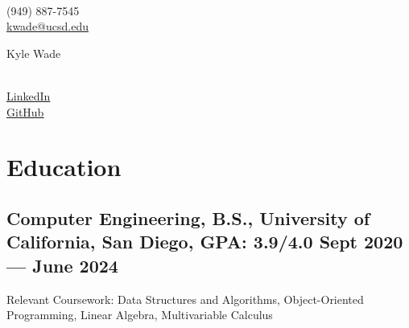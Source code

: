 \documentclass[a4,10pt]{article}
\newcommand{\subtext}[1]{
#1\par\vspace{-0.2cm}}
\begin{document}
\begin{center}
    \begin{minipage}[b]{0.24\textwidth}
            \large \\
            \large (949) 887-7545 \\
            \large \href{mailto:kwade@ucsd.edu}{kwade@ucsd.edu} 
    \end{minipage}%
    \begin{minipage}[b]{0.5\textwidth}
            \centering
            {\HUGE Kyle Wade} \\ %
            \vspace{0.1cm}
            {\color{UI_blue} \Large{}} \\
    \end{minipage}%
    \begin{minipage}[b]{0.24\textwidth}
            \flushright \large  %
            {\href{https://www.linkedin.com/in/kylewade1373/}{\underline{\textcolor{linkblue}{LinkedIn}}} } \\
            \href{https://github.com/kyle1373}{\underline{\textcolor{linkblue}{GitHub}}}
    \end{minipage} 
    \vspace{-0.45cm} 
\end{center}

\section{Education }
\subsection*{Computer Engineering, B.S., {\normalsize \normalfont University of California, San Diego, GPA: 3.9/4.0} \hfill Sept 2020 --- June 2024} 
\subtext{Relevant Coursework: Data Structures and Algorithms, Object-Oriented Programming, Linear Algebra, Multivariable Calculus}
\vspace{0cm}

\end{document}

